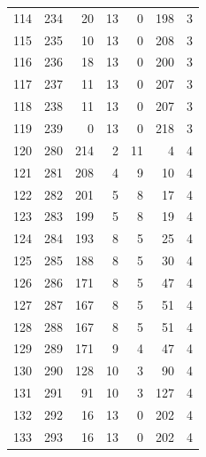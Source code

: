 \documentclass[a4paper,twoside,12pt]{book}
\begin{document}
\begin{appendices}
\begin{table}
\begin{tabular}{lrrrrrr}
		114 &    234 &        20 &        13 &               0 &             198 &         3 \\
		115 &    235 &        10 &        13 &               0 &             208 &         3 \\
		116 &    236 &        18 &        13 &               0 &             200 &         3 \\
		117 &    237 &        11 &        13 &               0 &             207 &         3 \\
		118 &    238 &        11 &        13 &               0 &             207 &         3 \\
		119 &    239 &         0 &        13 &               0 &             218 &         3 \\
		120 &    280 &       214 &         2 &              11 &               4 &         4 \\
		121 &    281 &       208 &         4 &               9 &              10 &         4 \\
		122 &    282 &       201 &         5 &               8 &              17 &         4 \\
		123 &    283 &       199 &         5 &               8 &              19 &         4 \\
		124 &    284 &       193 &         8 &               5 &              25 &         4 \\
		125 &    285 &       188 &         8 &               5 &              30 &         4 \\
		126 &    286 &       171 &         8 &               5 &              47 &         4 \\
		127 &    287 &       167 &         8 &               5 &              51 &         4 \\
		128 &    288 &       167 &         8 &               5 &              51 &         4 \\
		129 &    289 &       171 &         9 &               4 &              47 &         4 \\
		130 &    290 &       128 &        10 &               3 &              90 &         4 \\
		131 &    291 &        91 &        10 &               3 &             127 &         4 \\
		132 &    292 &        16 &        13 &               0 &             202 &         4 \\
		133 &    293 &        16 &        13 &               0 &             202 &         4 \\

\end{tabular}
\end{table}
\end{appendices}
\end{document}
